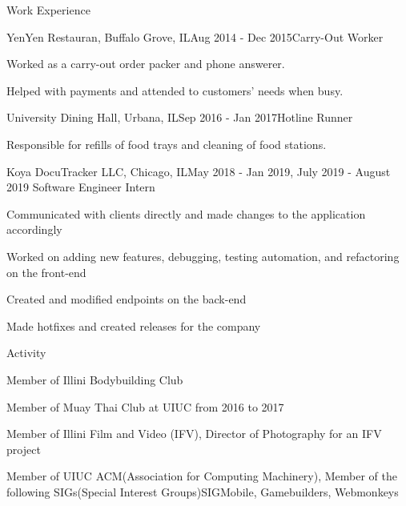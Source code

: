 \documentclass{resume}
\begin{document}
\begin{rSection}{Work Experience}

\begin{rSubsection}{YenYen Restauran, Buffalo Grove, IL}{Aug 2014 - Dec 2015}{Carry-Out Worker}{}
\item Worked as a carry-out order packer and phone answerer.
\item Helped with payments and attended to customers' needs when busy.
\end{rSubsection}

\begin{rSubsection}{University Dining Hall, Urbana, IL}{Sep 2016 - Jan 2017}{Hotline Runner}{}
\item Responsible for refills of food trays and cleaning of food stations.
\end{rSubsection}

\begin{rSubsection}{Koya DocuTracker LLC, Chicago, IL}{May 2018 - Jan 2019, July 2019 - August 2019}
{Software Engineer Intern}
\item Communicated with clients directly and made changes to the application accordingly
\item Worked on adding new features, debugging, testing automation, and refactoring on the front-end
\item Created and modified endpoints on the back-end
\item Made hotfixes and created releases for the company

\end{rSubsection}

\end{rSection}

\begin{rSection}{Activity} \itemsep -3pt

    \item Member of Illini Bodybuilding Club
    \item Member of Muay Thai Club at UIUC from 2016 to 2017
    \item Member of Illini Film and Video (IFV), Director of Photography for an IFV project
    \item Member of UIUC ACM(Association for Computing Machinery), Member of the following SIGs(Special Interest Groups)\colon SIGMobile, Gamebuilders, Webmonkeys

\end{rSection}
\end{document}
